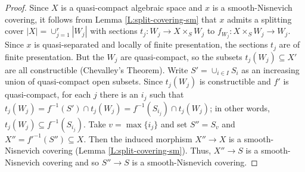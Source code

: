 \documentclass[10pt]{amsart}
\theoremstyle{plain}
\theoremstyle{definition}
\begin{document}
\begin{proof}
	Since $X$ is a quasi-compact algebraic space and $x$ is a
	smooth-Nisnevich covering, it follows from Lemma
	\ref{L:split-covering-sm} that $x$ admits a splitting cover
	$|X| = \cup_{j=1}^r |W_j|$ with sections
	$t_j \colon W_j \to X\times_S W_j$ to
	$f_{W_j} \colon X\times_S W_j \to W_j$. %
	Since $x$ is quasi-separated and locally of finite presentation, the
	sections $t_j$ are of finite presentation. But the $W_j$ are
	quasi-compact, so the subsets $t_j(W_j) \subseteq X'$ are all
	constructible (Chevalley's Theorem). Write $S' = \cup_{i\in I} S_i$
	as an increasing union of quasi-compact open subsets. Since
	$t_j(W_j)$ is constructible and $f'$ is quasi-compact, for each $j$
	there is an $i_j$ such that
	$t_j(W_j) = f^{-1}(S') \cap t_j(W_j) = f^{-1}(S_{i_j}) \cap
	t_j(W_j)$; in other words, $t_j(W_j) \subseteq
	f^{-1}(S_{i_j})$. Take $v = \max\{i_j\}$ and set $S'' = S_{v}$ and
	$X'' = f'^{-1}(S'') \subseteq X$. Then the induced morphism
	$X'' \to X$ is a smooth-Nisnevich covering (Lemma
	\ref{L:split-covering-sm}). Thus, $X'' \to S$ is a smooth-Nisnevich
	covering and so $S'' \to S$ is a smooth-Nisnevich covering.
\end{proof}
\end{document}
